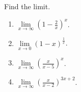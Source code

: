 Find the limit.
\begin{multicols}{2}
\begin{enumerate}
\item $\displaystyle \lim\limits_{x\to \infty} \left(1-\frac{2}{x} \right)^x$. 
\item $\displaystyle \lim\limits_{x\to 0} \left(1-x\right)^{\frac{1}{x}}$.
\item $\displaystyle \lim\limits_{x\to \infty} \left(\frac{x}{x-5}\right)^{x}$.
\item $\displaystyle \lim\limits_{x\to \infty} \left(\frac{x}{x-2}\right)^{3x+2}$.
\end{enumerate}
\end{multicols}